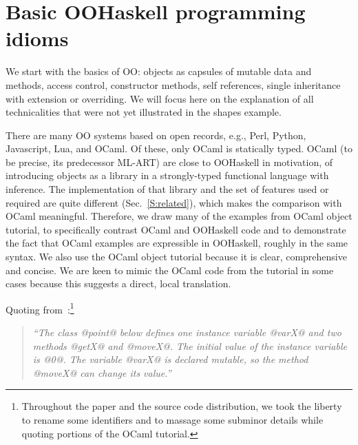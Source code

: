 \medskip

\section{Basic OOHaskell programming idioms}
\label{S:basics}

We start with the basics of OO: objects as capsules of mutable data
and methods, access control, constructor methods, self references,
single inheritance with extension or overriding. We will focus here
on the explanation of all technicalities that were not yet
illustrated in the shapes example.




\medskip


There are many OO systems based on open records, e.g., Perl, Python,
Javascript, Lua, and OCaml. Of these, only OCaml is statically
typed. OCaml (to be precise, its predecessor {ML-ART}) are close to
OOHaskell in motivation, of introducing objects as a library in a
strongly-typed functional language with inference. The implementation
of that library and the set of features used or required are quite
different (Sec.~\ref{S:related}), which makes the comparison with OCaml
meaningful. Therefore, we draw many of the examples from OCaml object
tutorial, to specifically contrast OCaml and OOHaskell code and to
demonstrate the fact that OCaml examples are expressible in OOHaskell,
roughly in the same syntax. We also use the OCaml object tutorial
because it is clear, comprehensive and concise.  We are keen to mimic
the OCaml code from the tutorial in some cases because this suggests a
direct, local translation.

Quoting from~\cite[\S\,3.1]{OCaml}:\footnote{Throughout the paper and
the source code distribution, we took the liberty to rename some
identifiers and to massage some subminor details while quoting
portions of the OCaml tutorial.}

\begin{quote}\itshape\small
``The class @point@ below defines one instance variable @varX@ and two
methods @getX@ and @moveX@. The initial value of the instance variable
is @0@. The variable @varX@ is declared mutable, so the method @moveX@
can change its value.''
\end{quote}

